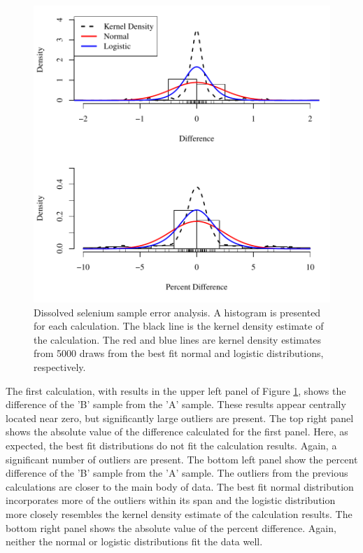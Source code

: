 \begin{linenumbers}
\begin{figure}[htbp]
\begin{center}
		\includegraphics[width=6in]{"Figures/Results_USR/CSe Error"}
\caption[Dissolved selenium sample error analysis.]{Dissolved selenium sample error analysis.  A histogram is presented for each calculation.  The black line is the kernel density estimate of the calculation.  The red and blue lines are kernel density estimates from 5000 draws from the best fit normal and logistic distributions, respectively.}
\label{fig:CSeError}
\end{center}
\end{figure}

The first calculation, with results in the upper left panel of Figure \ref{fig:CSeError}, shows the difference of the 'B' sample from the 'A' sample.  These results appear centrally located near zero, but significantly large outliers are present.  The top right panel shows the absolute value of the difference calculated for the first panel.  Here, as expected, the best fit distributions do not fit the calculation results.  Again, a significant number of outliers are present.  The bottom left panel show the percent difference of the 'B' sample from the 'A' sample.  The outliers from the previous calculations are closer to the main body of data.  The best fit normal distribution incorporates more of the outliers within its span and the logistic distribution more closely resembles the kernel density estimate of the calculation results.  The bottom right panel shows the absolute value of the percent difference.  Again, neither the normal or logistic distributions fit the data well.


\end{linenumbers}
